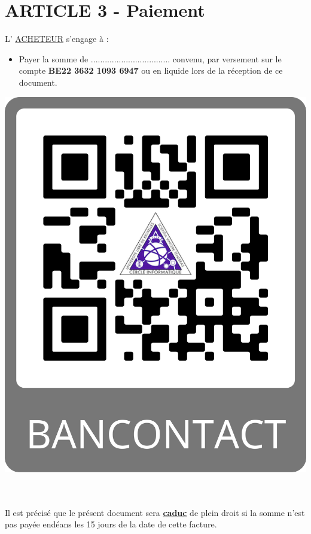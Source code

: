 \documentclass{article}
\begin{document}
\section*{ARTICLE 3 - Paiement}
L' \underline{ACHETEUR} s’engage à :

\begin{minipage}{0.6\textwidth}
\begin{itemize}
    \item Payer la somme de .................................. convenu, par versement sur le compte \textbf{BE22 3632 1093 6947} ou en liquide lors de la réception de ce document.
\end{itemize}
\end{minipage}
\begin{minipage}{0.4\textwidth}\raggedleft
\includegraphics[scale=0.04]{QRCodeBancontact.png}
\end{minipage}\\\\
Il est précisé que le présent document sera \textbf{\underline{caduc}} de plein droit si la somme n’est pas payée endéans les 15 jours de la date de cette facture. 
\end{document}
